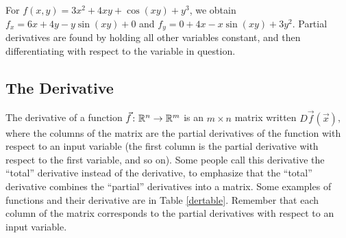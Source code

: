 \begin{example}
For $f(x,y)=3x^2+4xy+\cos(xy)+y^3$, we obtain $f_x=6x+4y-y\sin(xy)+0$ and $f_y=0+4x-x\sin(xy)+3y^2$. 
Partial derivatives are found by holding all other variables constant, and then differentiating with respect to the variable in question.
\end{example}

\subsection{The Derivative}
The derivative of a function $\vec f\colon\mathbb{R}^n\to\mathbb{R}^m$
is an $m\times n$ matrix written $D\vec f(\vec x)$, where the columns
of the matrix are the partial derivatives of the function with respect
to an input variable (the first column is the partial derivative with
respect to the first variable, and so on). Some people call this
derivative the ``total'' derivative instead of the derivative, to
emphasize that the ``total'' derivative combines the ``partial''
derivatives into a matrix. Some examples of functions and their
derivative are in Table \ref{dertable}. Remember that each column of
the matrix corresponds to the partial derivatives with respect to an input variable.
